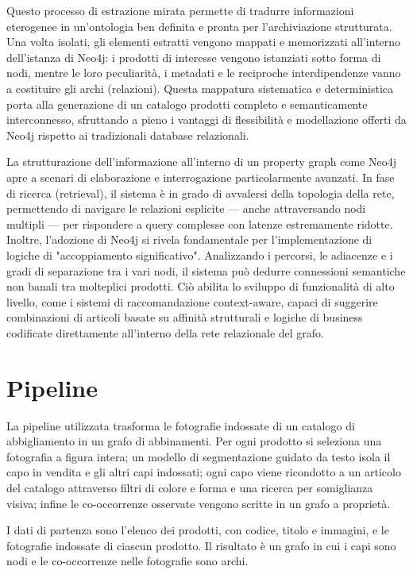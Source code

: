 Questo processo di estrazione mirata permette di tradurre informazioni eterogenee in un'ontologia ben definita e pronta per l'archiviazione strutturata.
Una volta isolati, gli elementi estratti vengono mappati e memorizzati all'interno dell'istanza di Neo4j: i prodotti di interesse vengono istanziati sotto forma
di nodi, mentre le loro peculiarità, i metadati e le reciproche interdipendenze vanno a costituire gli archi (relazioni).
Questa mappatura sistematica e deterministica porta alla generazione di un catalogo prodotti completo e semanticamente interconnesso,
sfruttando a pieno i vantaggi di flessibilità e modellazione offerti da Neo4j rispetto ai tradizionali database relazionali.

La strutturazione dell'informazione all'interno di un property graph come Neo4j apre a scenari di elaborazione e interrogazione particolarmente avanzati.
In fase di ricerca (retrieval), il sistema è in grado di avvalersi della topologia della rete, permettendo di navigare le relazioni esplicite
— anche attraversando nodi multipli — per rispondere a query complesse con latenze estremamente ridotte.
Inoltre, l'adozione di Neo4j si rivela fondamentale per l'implementazione di logiche di "accoppiamento significativo". Analizzando i percorsi, le adiacenze
e i gradi di separazione tra i vari nodi, il sistema può dedurre connessioni semantiche non banali tra molteplici prodotti. Ciò abilita lo sviluppo di funzionalità
di alto livello, come i sistemi di raccomandazione context-aware, capaci di suggerire combinazioni di articoli basate su affinità strutturali e logiche di business
codificate direttamente all'interno della rete relazionale del grafo.

\newpage

\section{Pipeline}

La pipeline utilizzata trasforma le fotografie indossate di un catalogo di abbigliamento in un grafo di abbinamenti. Per ogni prodotto si seleziona una fotografia
a figura intera; un modello di segmentazione guidato da testo isola il capo in vendita e gli altri capi indossati; ogni capo viene ricondotto a un articolo
del catalogo attraverso filtri di colore e forma e una ricerca per somiglianza visiva; infine le co-occorrenze osservate vengono scritte in un grafo a proprietà.

\noindent
I dati di partenza sono l'elenco dei prodotti, con codice, titolo e immagini, e le fotografie indossate di ciascun prodotto.
Il risultato è un grafo in cui i capi sono nodi e le co-occorrenze nelle fotografie sono archi.

